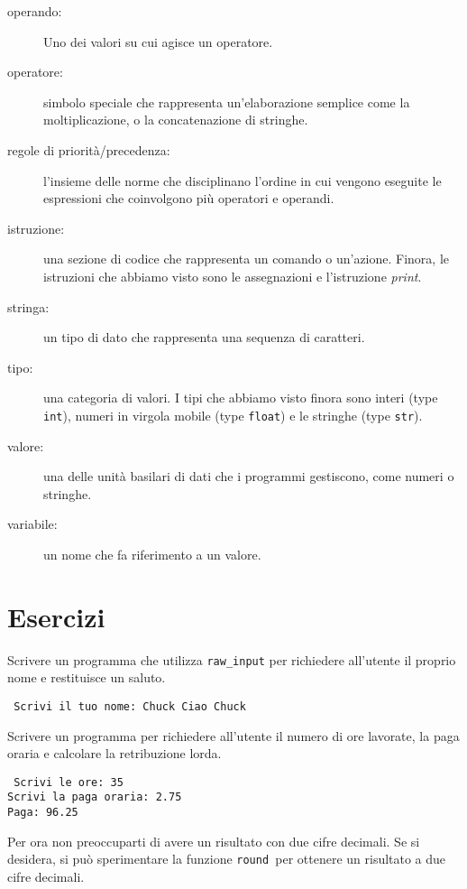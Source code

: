 \begin{description}
\item[operando:]  Uno dei valori su cui agisce un operatore.

\item[operatore:]  simbolo speciale che rappresenta un'elaborazione semplice come la moltiplicazione, o la concatenazione di stringhe. 

\item[regole di priorit\`{a}/precedenza:]  l'insieme delle norme che disciplinano l'ordine in cui vengono eseguite le espressioni che coinvolgono pi\`{u} operatori e operandi.  

\item[istruzione:]  una sezione di codice che rappresenta un comando o un'azione. Finora, le istruzioni che abbiamo visto sono le assegnazioni e l'istruzione \emph{print}.

\item[stringa:] un tipo di dato che rappresenta una sequenza di caratteri.

\item[tipo:] una categoria di valori. I tipi che abbiamo visto finora sono interi (type {\tt int}), numeri in virgola mobile (type {\tt float}) e le stringhe (type {\tt str}).

\item[valore:]  una delle unit\`{a} basilari di dati che i programmi gestiscono, come numeri o stringhe. 

\item[variabile:]  un nome che fa riferimento a un valore. 

\end{description}

\section{Esercizi}

\begin{ex} Scrivere un programma che utilizza \verb"raw_input" per richiedere all'utente il proprio nome e restituisce un saluto.

\begin{verbatim} Scrivi il tuo nome: Chuck Ciao Chuck \end{verbatim}

\end{ex}

\begin{ex} Scrivere un programma per richiedere all'utente il numero di ore lavorate, la paga oraria e calcolare la retribuzione lorda.
\begin{verbatim} Scrivi le ore: 35 
Scrivi la paga oraria: 2.75 
Paga: 96.25 \end{verbatim} \end{ex}
%
Per ora non preoccuparti di avere un risultato con due cifre decimali. Se si desidera, si pu\`{o} sperimentare la funzione {\tt round }per ottenere un risultato a due cifre decimali.

